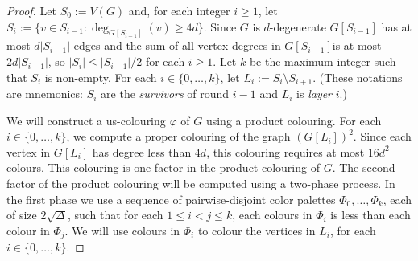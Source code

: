 \documentclass[kpfonts]{patmorin}
\newcommand{\defin}[1]{\emph{\color{brightmaroon}#1}}
\begin{document}
\begin{proof}
  Let $S_0:=V(G)$ and, for each integer $i\ge 1$, let $S_i:=\{v\in S_{i-1}:\deg_{G[S_{i-1}]}(v)\ge 4d\}$.  Since $G$ is $d$-degenerate $G[S_{i-1}]$ has at most $d|S_{i-1}|$ edges and the sum of all vertex degrees in $G[S_{i-1}]$is at most $2d|S_{i-1}|$, so $|S_i|\le |S_{i-1}|/2$ for each $i\ge 1$.  Let $k$ be the maximum integer such that $S_i$ is non-empty.  For each $i\in\{0,\ldots,k\}$, let $L_i:=S_i\setminus S_{i+1}$.  (These notations are mnemonics: $S_i$ are the \defin{survivors} of round $i-1$ and $L_i$ is \defin{layer} $i$.)

  We will construct a us-colouring $\varphi$ of $G$ using a product colouring.  For each $i\in\{0,\ldots,k\}$, we compute a proper colouring of the graph $(G[L_i])^2$.  Since each vertex in $G[L_i]$ has degree less than $4d$,
  this colouring requires at most $16d^2$ colours.  This colouring is one factor in the product colouring of $G$.
  The second factor of the product colouring will be computed using a two-phase process. In the first phase we use a sequence of pairwise-disjoint color palettes $\Phi_0,\ldots,\Phi_{k}$, each of size $2\sqrt{\Delta}$, such that for each $1\le i < j\le k$, each colours in $\Phi_i$ is less than each colour in $\Phi_j$.  We will use colours in $\Phi_i$ to colour the vertices in $L_i$, for each $i\in\{0,\ldots,k\}$.



\end{proof}
\end{document}

